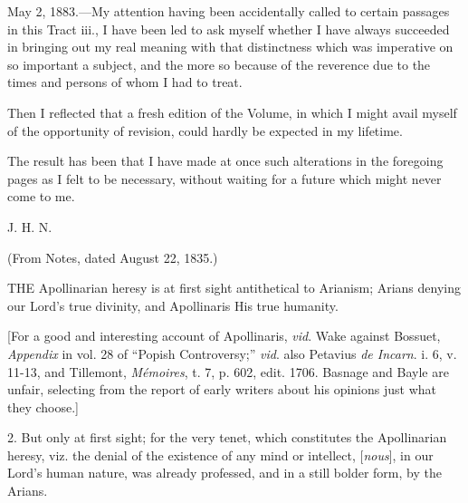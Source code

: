
May 2, 1883.—My attention having been accidentally called to
certain passages in this Tract iii., I have been led to ask myself
whether I have always succeeded in bringing out my real meaning with
that distinctness which was imperative on so important a subject, and
the more so because of the reverence due to the times and persons of
whom I had to treat.

Then I reflected that a fresh edition of the Volume, in which I
might avail myself of the opportunity of revision, could hardly be
expected in my lifetime.

The result has been that I have made at once such alterations in
the foregoing pages as I felt to be necessary, without waiting for a
future which might never come to me.

J. H. N.


(From Notes, dated August 22,
1835.)


THE Apollinarian heresy is at first
sight antithetical to Arianism; Arians denying our Lord's true
divinity, and Apollinaris His true humanity.

[For a good and interesting account of Apollinaris, \emph{vid}.
Wake against Bossuet, \emph{Appendix} in vol. 28 of ``Popish
Controversy;'' \emph{vid}. also Petavius \emph{de Incarn}. i. 6,
v. 11-13, and Tillemont, \emph{Mémoires}, t. 7, p. 602, edit. 1706.
Basnage and Bayle are unfair, selecting from the report of early
writers about his opinions just what they choose.]

2. But only at first sight; for the very tenet, which constitutes
the Apollinarian heresy, viz. the denial of the existence of any mind
or intellect, [\emph{nous}], in our Lord's human nature, was already
professed, and in a still bolder form, by the Arians.

